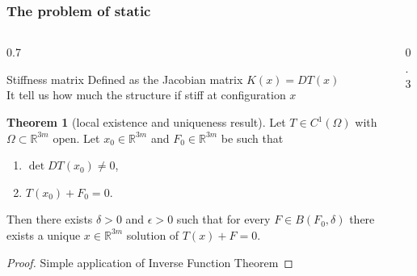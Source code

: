 \documentclass[10pt]{beamer}
\theoremstyle{definition}
\newtheorem{teorema}{Theorem}
\begin{document}
\begin{frame}

\frametitle{The problem of static}

\begin{columns}
\begin{column}{0.7\framewidth}
\begin{block}{Stiffness matrix}
Defined as the Jacobian matrix $K(x)=DT(x)$ \\
It tell us how much the structure if stiff at configuration $x$
\end{block}
\begin{teorema}[local existence and uniqueness result]
Let $T\in C^1(\Omega)$ with $\Omega\subset\mathbb{R}^{3m}$ open. Let $x_0\in\mathbb{R}^{3m}$ and $F_0\in\mathbb{R}^{3m}$ be such that
\begin{enumerate}
\item $\det DT(x_0)\neq0$,
\item $T(x_0)+F_0=0$.
\end{enumerate}
Then there exists $\delta>0$ and $\epsilon>0$ such that for every $F\in B(F_0,\delta)$ there exists a unique $x\in\mathbb{R}^{3m}$ solution of $T(x)+F=0$.
\end{teorema}
\begin{proof}
Simple application of Inverse Function Theorem
\end{proof}
\end{column}
\begin{column}{0.3\framewidth}
\begin{center}
\end{center}
\vspace{20pt}
\begin{center}
\end{center}
\end{column}
\end{columns}

\end{frame}
\end{document}
